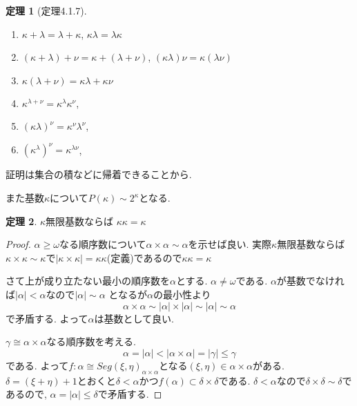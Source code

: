 \documentclass[dvipdfmx,a4paper,11pt]{article}
\theoremstyle{definition}
\newtheorem{thm}{定理}
\begin{document}
 \begin{tcolorbox}
 [colback = white, colframe = green!35!black, fonttitle = \bfseries,breakable = true]
\begin{thm}[定理4.1.7]
\begin{enumerate}
\item $\kappa + \lambda = \lambda + \kappa$, $\kappa \lambda = \lambda \kappa$
\item $(\kappa + \lambda) +\nu  = \kappa  + (\lambda + \nu)$, $(\kappa \lambda)\nu  = \kappa(\lambda   \nu)$
\item $\kappa  (\lambda + \nu) = \kappa  \lambda + \kappa \nu$
\item $\kappa^{\lambda + \nu} = \kappa ^\lambda  \kappa^\nu$, 
\item $(\kappa\lambda)^\nu = \kappa ^\nu  \lambda^\nu$, 
\item $(\kappa^\lambda)^\nu = \kappa ^{ \lambda \nu}$, 
\end{enumerate}
\end{thm}
\end{tcolorbox}
証明は集合の積などに帰着できることから. 

また基数$\kappa$について$P(\kappa) \sim 2^{\kappa}$となる. 

 \begin{tcolorbox}
 [colback = white, colframe = green!35!black, fonttitle = \bfseries,breakable = true]
\begin{thm}
$\kappa$無限基数ならば
$\kappa\kappa = \kappa$
\end{thm}
\end{tcolorbox}
\begin{proof}
$\alpha \ge \omega$なる順序数について$\alpha \times \alpha \sim \alpha$を示せば良い.
実際$\kappa$無限基数ならば
$\kappa \times \kappa \sim \kappa$で$|\kappa \times \kappa|=\kappa\kappa$(定義)であるので$\kappa\kappa = \kappa$

さて上が成り立たない最小の順序数を$\alpha$とする.
$\alpha \neq \omega$である.
$\alpha$が基数でなければ$|\alpha| < \alpha$なので$|\alpha| \sim \alpha$
となるが$\alpha$の最小性より
$$
\alpha \times \alpha \sim |\alpha|\times |\alpha| \sim |\alpha|\sim \alpha
$$
で矛盾する.
よって$\alpha$は基数として良い. 

$\gamma \cong \alpha \times \alpha$なる順序数を考える. 
$$
\alpha =|\alpha| < |\alpha \times \alpha | = |\gamma| \le \gamma
$$である. 
よって$f: \alpha \cong Seg(\xi,\eta)_{\alpha \times \alpha}$となる$(\xi,\eta) \in \alpha \times \alpha $がある. 
$\delta = (\xi+\eta) +1$とおくと$\delta<\alpha$かつ$f(\alpha) \subset \delta \times \delta $である. $\delta < \alpha$なので$\delta \times \delta \sim \delta$であるので, 
$\alpha =|\alpha| \le \delta$で矛盾する. 
\end{proof}
\end{document}
